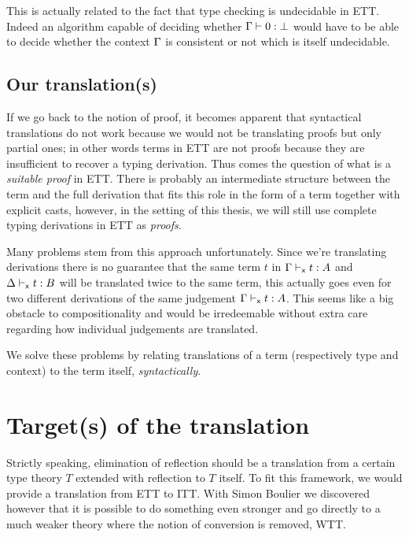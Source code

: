 This is actually related to the fact that type checking is undecidable in
\acrshort{ETT}. Indeed an algorithm capable of deciding whether
\(\Gamma \vdash 0 : \bot\) would have to be able to decide whether the context
\(\Gamma\) is consistent or not which is itself undecidable.

\subsection{Our translation(s)}

If we go back to the notion of proof, it becomes apparent that
syntactical translations do not work because we would not be translating proofs
but only partial ones; in other words terms in \acrshort{ETT} are not proofs
because they are insufficient to recover a typing derivation.
Thus comes the question of what is a \emph{suitable proof} in \acrshort{ETT}.
There is probably an intermediate structure between the term and the full
derivation that fits this role in the form of a term together with explicit
casts, however, in the setting of this thesis, we will still use complete
typing derivations in \acrshort{ETT} as \emph{proofs}.

Many problems stem from this approach unfortunately. Since we're translating
derivations there is no guarantee that the same term \(t\) in
\(\Gamma \vdash_{\mathsf{x}} t : A\) and \(\Delta \vdash_{\mathsf{x}} t : B\) will be translated
twice to the same term, this actually goes even for two different derivations
of the same judgement \(\Gamma \vdash_{\mathsf{x}} t : A\).
This seems like a big obstacle to compositionality and would be irredeemable
without extra care regarding how individual judgements are translated.

We solve these problems by relating translations of a term (respectively
type and context) to the term itself, \emph{syntactically}.

\section{Target(s) of the translation}

Strictly speaking, elimination of reflection should be a translation from a
certain type theory \(T\) extended with reflection to \(T\) itself.
To fit this framework, we would provide a translation from \acrshort{ETT}
to \acrshort{ITT}. With Simon Boulier we discovered however that it is possible
to do something even stronger and go directly to a much weaker theory where
the notion of conversion is removed, \acrshort{WTT}.


